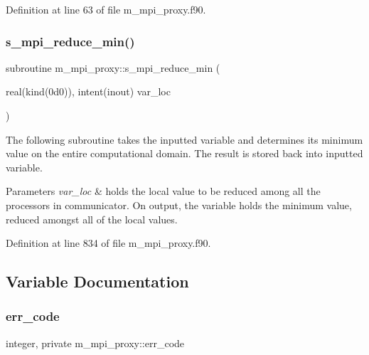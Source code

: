 Definition at line 63 of file m\+\_\+mpi\+\_\+proxy.\+f90.

\mbox{\label{namespacem__mpi__proxy_ad02d11c9b94b9354f7d8234937bb27a2}} 
\subsubsection{\texorpdfstring{s\+\_\+mpi\+\_\+reduce\+\_\+min()}{s\_mpi\_reduce\_min()}}
{\footnotesize\ttfamily subroutine m\+\_\+mpi\+\_\+proxy\+::s\+\_\+mpi\+\_\+reduce\+\_\+min (\begin{DoxyParamCaption}\item[{real(kind(0d0)), intent(inout)}]{var\+\_\+loc }\end{DoxyParamCaption})}



The following subroutine takes the inputted variable and determines its minimum value on the entire computational domain. The result is stored back into inputted variable. 


\begin{DoxyParams}{Parameters}
{\em var\+\_\+loc} & holds the local value to be reduced among all the processors in communicator. On output, the variable holds the minimum value, reduced amongst all of the local values. \\
\hline
\end{DoxyParams}


Definition at line 834 of file m\+\_\+mpi\+\_\+proxy.\+f90.



\subsection{Variable Documentation}
\mbox{\label{namespacem__mpi__proxy_ae5709407e3600d19d79b183e409bb982}} 
\subsubsection{\texorpdfstring{err\+\_\+code}{err\_code}}
{\footnotesize\ttfamily integer, private m\+\_\+mpi\+\_\+proxy\+::err\+\_\+code\hspace{0.3cm}{\ttfamily [private]}}



